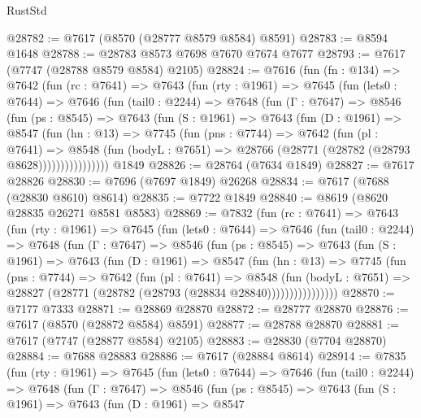 \begin{lexlean}{RustStd}
\begin{coremodule}
@28782 := @7617 (@8570 (@28777 @8579 @8584) @8591)
@28783 := @8594 @1648
@28788 := @28783 @8573 @7698 @7670 @7674 @7677
@28793 := @7617 (@7747 (@28788 @8579 @8584) @2105)
@28824 := @7616
    (fun (fn : @134) =>
    @7642
      (fun (rc : @7641) =>
      @7643
        (fun (rty : @1961) =>
        @7645
          (fun (lets0 : @7644) =>
          @7646
            (fun (tail0 : @2244) =>
            @7648
              (fun (Γ : @7647) =>
              @8546
                (fun (ps : @8545) =>
                @7643
                  (fun (S : @1961) =>
                  @7643
                    (fun (D : @1961) =>
                    @8547
                      (fun (hn : @13) =>
                      @7745
                        (fun (pns : @7744) =>
                        @7642
                          (fun (pl : @7641) =>
                          @8548
                            (fun (bodyL : @7651) =>
                            @28766 (@28771 (@28782 (@28793 @8628))))))))))))))))
    @1849
@28826 := @28764 (@7634 @1849)
@28827 := @7617 @28826
@28830 := @7696 (@7697 @1849) @26268
@28834 := @7617 (@7688 (@28830 @8610) @8614)
@28835 := @7722 @1849
@28840 := @8619 (@8620 @28835 @26271 @8581 @8583)
@28869 := @7832
    (fun (rc : @7641) =>
    @7643
      (fun (rty : @1961) =>
      @7645
        (fun (lets0 : @7644) =>
        @7646
          (fun (tail0 : @2244) =>
          @7648
            (fun (Γ : @7647) =>
            @8546
              (fun (ps : @8545) =>
              @7643
                (fun (S : @1961) =>
                @7643
                  (fun (D : @1961) =>
                  @8547
                    (fun (hn : @13) =>
                    @7745
                      (fun (pns : @7744) =>
                      @7642
                        (fun (pl : @7641) =>
                        @8548
                          (fun (bodyL : @7651) =>
                          @28827 (@28771 (@28782 (@28793 (@28834 @28840))))))))))))))))
@28870 := @7177 @7333
@28871 := @28869 @28870
@28872 := @28777 @28870
@28876 := @7617 (@8570 (@28872 @8584) @8591)
@28877 := @28788 @28870
@28881 := @7617 (@7747 (@28877 @8584) @2105)
@28883 := @28830 (@7704 @28870)
@28884 := @7688 @28883
@28886 := @7617 (@28884 @8614)
@28914 := @7835
    (fun (rty : @1961) =>
    @7645
      (fun (lets0 : @7644) =>
      @7646
        (fun (tail0 : @2244) =>
        @7648
          (fun (Γ : @7647) =>
          @8546
            (fun (ps : @8545) =>
            @7643
              (fun (S : @1961) =>
              @7643
                (fun (D : @1961) =>
                @8547

\end{coremodule}
\end{lexlean}
